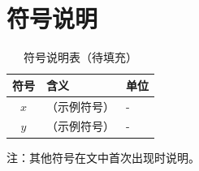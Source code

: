 
\section{符号说明}\label{sec:notations}

\begin{table}[H]
    \centering
    \caption{符号说明表（待填充）}\label{tab:notations}
    \begin{tabular}{c l l}
        \toprule
        \textbf{符号} & \textbf{含义} & \textbf{单位} \\
        \midrule
        $x$ & （示例符号） & - \\
        $y$ & （示例符号） & - \\
        \bottomrule
    \end{tabular}
\end{table}

\noindent 注：其他符号在文中首次出现时说明。
